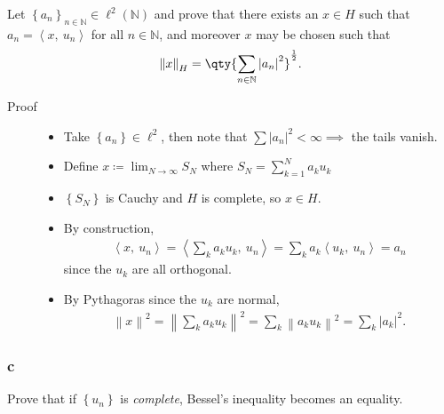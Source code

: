 Let
\(\left\{{a_n}\right\}_{n\in {\mathbb{N}}} \in \ell^2({\mathbb{N}})\)
and prove that there exists an \(x\in H\) such that
\(a_n = {\left\langle {x},~{u_n} \right\rangle}\) for all
\(n\in {\mathbb{N}}\), and moreover \(x\) may be chosen such that
\begin{align*} {\left\lVert {x} \right\rVert}_H = \qty{ \sum_{n\in {\mathbb{N}}} {\left\lvert {a_n} \right\rvert}^2}^{1\over 2} .\end{align*}

\begin{description}
\item[Proof]
\hfill

\begin{itemize}
\item
  Take \(\left\{{a_n}\right\} \in \ell^2\), then note that
  \(\sum {\left\lvert {a_n} \right\rvert}^2 < \infty \implies\) the
  tails vanish.
\item
  Define \(x \coloneqq\displaystyle\lim_{N\to\infty} S_N\) where
  \(S_N = \sum_{k=1}^N a_k u_k\)
\item
  \(\left\{{S_N}\right\}\) is Cauchy and \(H\) is complete, so
  \(x\in H\).
\item
  By construction,
  \begin{align*}     {\left\langle {x},~{u_n} \right\rangle} = {\left\langle {\sum_k a_k u_k},~{u_n} \right\rangle} = \sum_k a_k {\left\langle {u_k},~{u_n} \right\rangle} = a_n      \end{align*}
  since the \(u_k\) are all orthogonal.
\item
  By Pythagoras since the \(u_k\) are normal,
  \begin{align*}     {\left\lVert {x} \right\rVert}^2 = {\left\lVert {\sum_k a_k u_k} \right\rVert}^2 = \sum_k {\left\lVert {a_k u_k} \right\rVert}^2 = \sum_k {\left\lvert {a_k} \right\rvert}^2     .\end{align*}
\end{itemize}
\end{description}

\hypertarget{c-1}{%
\subsubsection{c}\label{c-1}}

Prove that if \(\left\{{u_n}\right\}\) is \emph{complete}, Bessel's
inequality becomes an equality.

